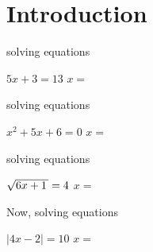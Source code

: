 \section{Introduction}

\begin{tcbraster}[
    raster equal height, 
    raster columns = 2,
    raster column skip = 0.5in,
]
    \begin{tcolorbox}[colback=white,boxrule=0.5pt,]
        \raggedright
        {\small solving  equations \phantom{xxxxxxx}}
        \begin{center}
            \small
            $5x +3 = 13$
            \quad{\large$\Rightarrow$}\quad
            $x =$ 
        \end{center}
    \end{tcolorbox}
    \begin{tcolorbox}[colback=white,boxrule=0.5pt,]
        \raggedright
        {\small solving  equations}
        \begin{center}
            \small
            $x^2 + 5x + 6 = 0$
            \quad{\large$\Rightarrow$}\quad
            $x =$ 
        \end{center}
    \end{tcolorbox}
    \begin{tcolorbox}[colback=white,boxrule=0.5pt,]
        \raggedright
        {\small solving  equations}
        \begin{center}
            \small
            $\myRoot{6x+1} = 4$
            \quad{\large$\Rightarrow$}\quad
            $x =$ 
        \end{center}
    \end{tcolorbox}
    \begin{tcolorbox}[colback=white,boxrule=0.5pt,]
        \raggedright
        {\small Now, solving  equations}
        \begin{center}
            \small
            $|4x -2 | = 10$
            \quad{\large$\Rightarrow$}\quad
            $x =$ 
        \end{center}
    \end{tcolorbox}
\end{tcbraster}

